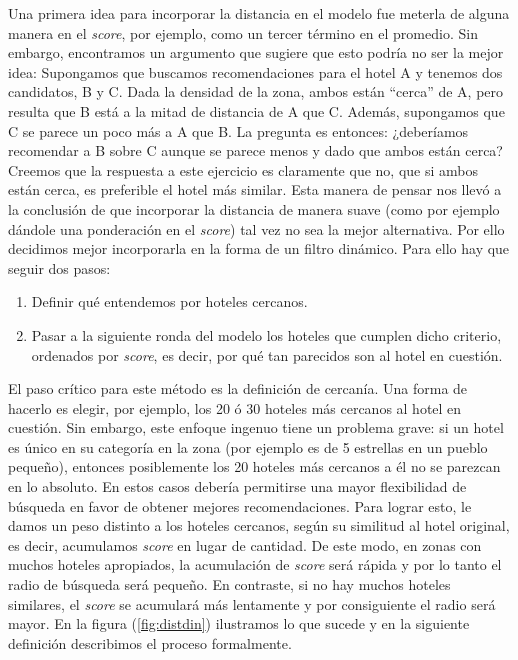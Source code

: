 \documentclass[12pt]{report}
\begin{document}
Una primera idea para incorporar la distancia en el modelo fue meterla de alguna manera en el \emph{score}, por ejemplo, como un tercer término en el promedio. Sin embargo, encontramos un argumento que sugiere que esto podría no ser la mejor idea: Supongamos que buscamos recomendaciones para el hotel A y tenemos dos candidatos, B y C. Dada la densidad de la zona, ambos están ``cerca'' de A, pero resulta que B está a la mitad de distancia de A que C. Además, supongamos que C se parece un poco más a A que B. La pregunta es entonces: ¿deberíamos recomendar a B sobre C aunque se parece menos y dado que ambos están cerca? Creemos que la respuesta a este ejercicio es claramente que no, que si ambos están cerca, es preferible el hotel más similar. Esta manera de pensar nos llevó a la conclusión de que incorporar la distancia de manera suave (como por ejemplo dándole una ponderación en el \emph{score}) tal vez no sea la mejor alternativa. Por ello decidimos mejor incorporarla en la forma de un filtro dinámico. Para ello hay que seguir dos pasos:
\begin{enumerate}
	\item Definir qué entendemos por hoteles cercanos.
	\item Pasar a la siguiente ronda del modelo los hoteles que cumplen dicho criterio, ordenados por \emph{score}, es decir, por qué tan parecidos son al hotel en cuestión.
\end{enumerate}
El paso crítico para este método es la definición de cercanía. Una forma de hacerlo es elegir, por ejemplo, los 20 ó 30 hoteles más cercanos al hotel en cuestión. Sin embargo, este enfoque ingenuo tiene un problema grave: si un hotel es único en su categoría en la zona (por ejemplo es de 5 estrellas en un pueblo pequeño), entonces posiblemente los 20 hoteles más cercanos a él no se parezcan en lo absoluto. En estos casos debería permitirse una mayor flexibilidad de búsqueda en favor de obtener mejores recomendaciones. Para lograr esto, le damos un peso distinto a los hoteles cercanos, según su similitud al hotel original, es decir, acumulamos \emph{score} en lugar de cantidad. De este modo, en zonas con muchos hoteles apropiados, la acumulación de \emph{score} será rápida y por lo tanto el radio de búsqueda será pequeño. En contraste, si no hay muchos hoteles similares, el \emph{score} se acumulará más lentamente y por consiguiente el radio será mayor. En la figura (\ref{fig:distdin}) ilustramos lo que sucede y en la siguiente definición describimos el proceso formalmente.
\end{document}

